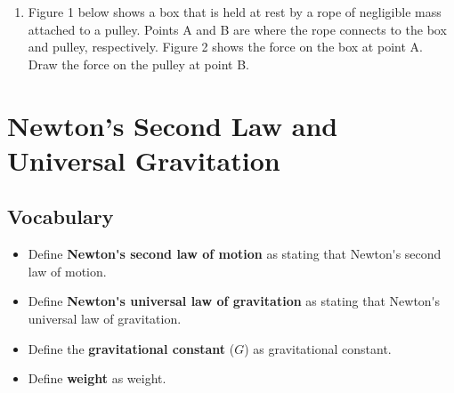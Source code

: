 \documentclass[dvipsnames]{article}
\begin{document}
\begin{enumerate}
\begin{center}
\end{center}

\item Figure 1 below shows a box that is held at rest by a rope of negligible mass attached to a pulley. Points A and B are where the rope connects to the box and pulley, respectively. Figure 2 shows the force on the box at point A. Draw the force on the pulley at point B.

\begin{center}
\hspace{1cm}
\end{center}
\end{enumerate}

\clearpage

\section{Newton's Second Law and Universal Gravitation}

\subsection*{Vocabulary}

\begin{itemize}[itemsep=0pt]
    \item Define \textbf{\gls{Newton's second law of motion}} as stating that \glsdesc{Newton's second law of motion}.
    \item Define \textbf{\gls{Newton's universal law of gravitation}} as stating that \glsdesc{Newton's universal law of gravitation}.
    \item Define the \textbf{\gls{gravitational constant}} ($G$) as \glsdesc{gravitational constant}.
    \item Define \textbf{\gls{weight}} as \glsdesc{weight}.
\end{itemize}
\end{document}
